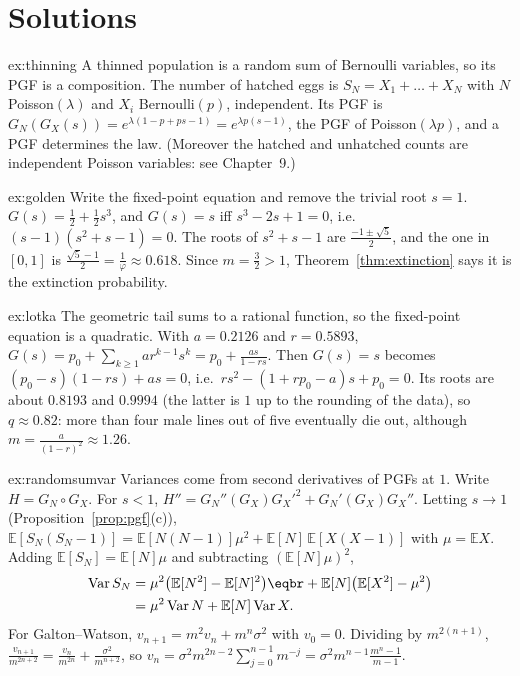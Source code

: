 \section{Solutions}

\begin{solution}{ex:thinning}
\idea A thinned population is a random sum of Bernoulli variables, so its PGF is a composition.
\writeup The number of hatched eggs is $S_N=X_1+\dots+X_N$ with $N$ Poisson$(\lambda)$ and $X_i$ Bernoulli$(p)$, independent. Its PGF
is $G_N(G_X(s))=e^{\lambda(1-p+ps-1)}=e^{\lambda p(s-1)}$, the PGF of Poisson$(\lambda p)$, and a PGF determines the law. (Moreover the
hatched and unhatched counts are independent Poisson variables: see Chapter~9.)
\end{solution}

\begin{solution}{ex:golden}
\idea Write the fixed-point equation and remove the trivial root $s=1$.
\writeup $G(s)=\frac12+\frac12s^3$, and $G(s)=s$ iff $s^3-2s+1=0$, i.e.\ $(s-1)(s^2+s-1)=0$. The roots of $s^2+s-1$ are $\frac{-1\pm\sqrt5}2$,
and the one in $[0,1]$ is $\frac{\sqrt5-1}2=\frac1\varphi\approx0.618$. Since $m=\frac32>1$, Theorem~\ref{thm:extinction} says it is the extinction
probability.
\end{solution}

\begin{solution}{ex:lotka}
\idea The geometric tail sums to a rational function, so the fixed-point equation is a quadratic.
\writeup With $a=0.2126$ and $r=0.5893$, $G(s)=p_0+\sum_{k\ge1}ar^{k-1}s^k=p_0+\frac{as}{1-rs}$. Then $G(s)=s$ becomes
$(p_0-s)(1-rs)+as=0$, i.e.\ $rs^2-(1+rp_0-a)s+p_0=0$. Its roots are about $0.8193$ and $0.9994$ (the latter is $1$ up to the rounding of
the data), so $q\approx0.82$: more than four male lines out of five eventually die out, although $m=\frac a{(1-r)^2}\approx1.26$.
\end{solution}

\begin{solution}{ex:randomsumvar}
\idea Variances come from second derivatives of PGFs at $1$.
\writeup Write $H=G_N\circ G_X$. For $s<1$, $H''=G_N''(G_X)G_X'^2+G_N'(G_X)G_X''$. Letting $s\to1$ (Proposition~\ref{prop:pgf}(c)),
$\mathbb E[S_N(S_N-1)]=\mathbb E[N(N-1)]\mu^2+\mathbb E[N]\,\mathbb E[X(X-1)]$ with $\mu=\mathbb EX$. Adding $\mathbb E[S_N]=\mathbb E[N]\mu$ and subtracting $(\mathbb E[N]\mu)^2$,
\[
\begin{aligned}\operatorname{Var}S_N&=\mu^2\bigl(\mathbb E[N^2]-\mathbb E[N]^2\bigr)\eqbr+\mathbb E[N]\bigl(\mathbb E[X^2]-\mu^2\bigr)\\&=\mu^2\operatorname{Var}N+\mathbb E[N]\operatorname{Var}X.\end{aligned}
\]
For Galton--Watson, $v_{n+1}=m^2v_n+m^n\sigma^2$ with $v_0=0$. Dividing by $m^{2(n+1)}$, $\frac{v_{n+1}}{m^{2n+2}}=\frac{v_n}{m^{2n}}+\frac{\sigma^2}{m^{n+2}}$, so
$v_n=\sigma^2m^{2n-2}\sum_{j=0}^{n-1}m^{-j}=\sigma^2m^{n-1}\frac{m^n-1}{m-1}$.
\end{solution}

